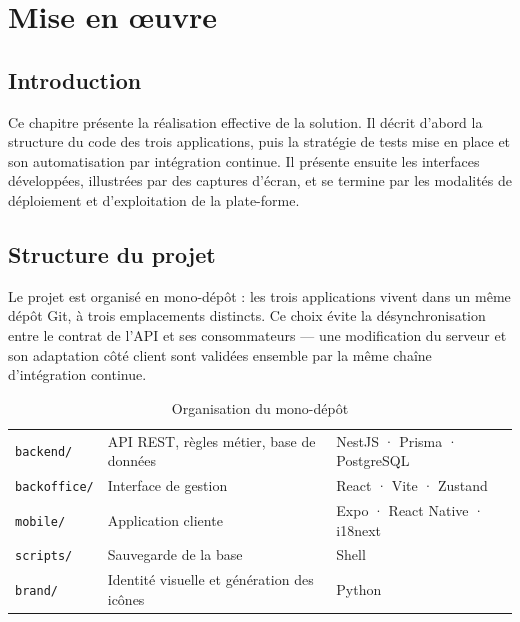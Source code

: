 \chapter{Mise en \oe uvre}

\section*{Introduction}

Ce chapitre présente la réalisation effective de la solution. Il décrit d'abord
la structure du code des trois applications, puis la stratégie de tests mise en
place et son automatisation par intégration continue. Il présente ensuite les
interfaces développées, illustrées par des captures d'écran, et se termine par
les modalités de déploiement et d'exploitation de la plate-forme.

\section{Structure du projet}

Le projet est organisé en mono-dépôt : les trois applications vivent dans un
même dépôt Git, à trois emplacements distincts. Ce choix évite la
désynchronisation entre le contrat de l'API et ses consommateurs --- une
modification du serveur et son adaptation côté client sont validées ensemble
par la même chaîne d'intégration continue.

\begin{table}[H]
\centering
\caption{Organisation du mono-dépôt}
\label{tab:monodepot}
\begin{tabularx}{\textwidth}{L{2.4cm} L{3.4cm} X}
\toprule
{} &  &  \\
\midrule
\texttt{backend/} & API REST, règles métier, base de données &
NestJS · Prisma · PostgreSQL \\
\texttt{backoffice/} & Interface de gestion &
React · Vite · Zustand \\
\texttt{mobile/} & Application cliente &
Expo · React Native · i18next \\
\texttt{scripts/} & Sauvegarde de la base & Shell \\
\texttt{brand/} & Identité visuelle et génération des icônes & Python \\
\bottomrule
\end{tabularx}
\end{table}

